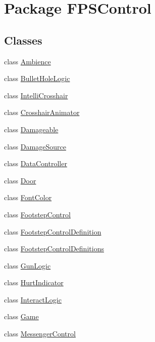 \hypertarget{namespace_f_p_s_control}{\section{Package F\-P\-S\-Control}
\label{namespace_f_p_s_control}
}
\subsection*{Classes}
\begin{DoxyCompactItemize}
\item 
class \hyperlink{class_f_p_s_control_1_1_ambience}{Ambience}
\item 
class \hyperlink{class_f_p_s_control_1_1_bullet_hole_logic}{Bullet\-Hole\-Logic}
\item 
class \hyperlink{class_f_p_s_control_1_1_intelli_crosshair}{Intelli\-Crosshair}
\item 
class \hyperlink{class_f_p_s_control_1_1_crosshair_animator}{Crosshair\-Animator}
\item 
class \hyperlink{class_f_p_s_control_1_1_damageable}{Damageable}
\item 
class \hyperlink{class_f_p_s_control_1_1_damage_source}{Damage\-Source}
\item 
class \hyperlink{class_f_p_s_control_1_1_data_controller}{Data\-Controller}
\item 
class \hyperlink{class_f_p_s_control_1_1_door}{Door}
\item 
class \hyperlink{class_f_p_s_control_1_1_font_color}{Font\-Color}
\item 
class \hyperlink{class_f_p_s_control_1_1_footstep_control}{Footstep\-Control}
\item 
class \hyperlink{class_f_p_s_control_1_1_footstep_control_definition}{Footstep\-Control\-Definition}
\item 
class \hyperlink{class_f_p_s_control_1_1_footstep_control_definitions}{Footstep\-Control\-Definitions}
\item 
class \hyperlink{class_f_p_s_control_1_1_gun_logic}{Gun\-Logic}
\item 
class \hyperlink{class_f_p_s_control_1_1_hurt_indicator}{Hurt\-Indicator}
\item 
class \hyperlink{class_f_p_s_control_1_1_interact_logic}{Interact\-Logic}
\item 
class \hyperlink{class_f_p_s_control_1_1_game}{Game}
\item 
class \hyperlink{class_f_p_s_control_1_1_messenger_control}{Messenger\-Control}

\end{DoxyCompactItemize}
